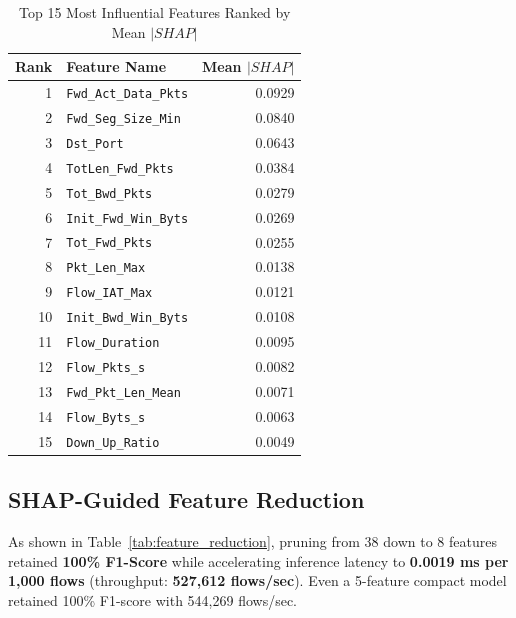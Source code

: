 \documentclass[conference]{IEEEtran}
\begin{document}
\begin{table}[h]
\caption{Top 15 Most Influential Features Ranked by Mean $|SHAP|$}
\label{tab:shap_features}
\centering
\begin{tabular}{rlr}
\toprule
\textbf{Rank} & \textbf{Feature Name} & \textbf{Mean $|SHAP|$} \\
\midrule
1 & \texttt{Fwd\_Act\_Data\_Pkts} & 0.0929 \\
2 & \texttt{Fwd\_Seg\_Size\_Min} & 0.0840 \\
3 & \texttt{Dst\_Port} & 0.0643 \\
4 & \texttt{TotLen\_Fwd\_Pkts} & 0.0384 \\
5 & \texttt{Tot\_Bwd\_Pkts} & 0.0279 \\
6 & \texttt{Init\_Fwd\_Win\_Byts} & 0.0269 \\
7 & \texttt{Tot\_Fwd\_Pkts} & 0.0255 \\
8 & \texttt{Pkt\_Len\_Max} & 0.0138 \\
9 & \texttt{Flow\_IAT\_Max} & 0.0121 \\
10 & \texttt{Init\_Bwd\_Win\_Byts} & 0.0108 \\
11 & \texttt{Flow\_Duration} & 0.0095 \\
12 & \texttt{Flow\_Pkts\_s} & 0.0082 \\
13 & \texttt{Fwd\_Pkt\_Len\_Mean} & 0.0071 \\
14 & \texttt{Flow\_Byts\_s} & 0.0063 \\
15 & \texttt{Down\_Up\_Ratio} & 0.0049 \\
\bottomrule
\end{tabular}
\end{table}

\subsection{SHAP-Guided Feature Reduction}
As shown in Table~\ref{tab:feature_reduction}, pruning from 38 down to 8 features retained \textbf{100\% F1-Score} while accelerating inference latency to \textbf{0.0019 ms per 1,000 flows} (throughput: \textbf{527,612 flows/sec}). Even a 5-feature compact model retained 100\% F1-score with 544,269 flows/sec.
\end{document}
